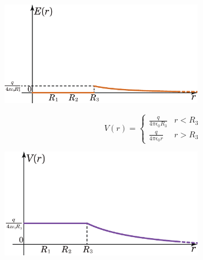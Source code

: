 \begin{center}
	\includegraphics[width=0.65\textwidth]{images/chp4/chp4sferacava3graf1.pdf}
\end{center}
\begin{equation*}
	V(r)=\begin{cases}
		\frac{q}{4\pi\epsilon_0R_3} & r<R_3\\
		\frac{q}{4\pi\epsilon_0r} & r>R_3
	\end{cases}
\end{equation*}
\begin{center}
	\includegraphics[width=0.65\textwidth]{images/chp4/chp4sferacava3graf2.pdf}
\end{center}
